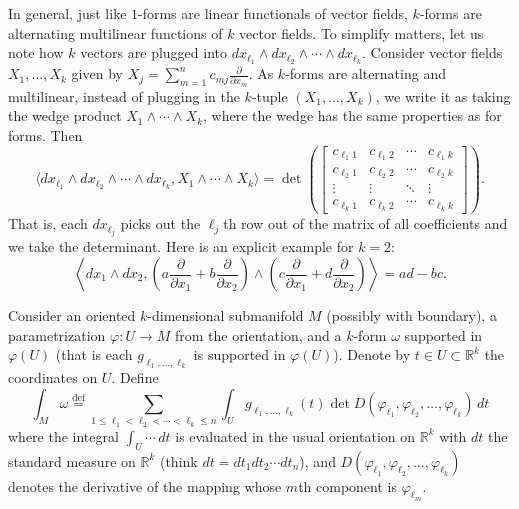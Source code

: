 \documentclass[12pt,openany]{book}
\newcommand{\R}{{\mathbb{R}}}
\theoremstyle{plain}
\theoremstyle{remark}
\theoremstyle{definition}
\theoremstyle{exercise}
\theoremstyle{example}
\begin{document}
In general, just like $1$-forms are linear functionals of vector fields,
$k$-forms are alternating multilinear functions of $k$ vector fields.
To simplify matters, let us note how
$k$ vectors are plugged into
$dx_{\ell_1} \wedge dx_{\ell_2} \wedge \cdots \wedge dx_{\ell_k}$.
Consider vector fields $X_1,\ldots,X_k$ given by
$X_j = \sum_{m=1}^n c_{m j} \frac{\partial}{\partial x_m}$.
As $k$-forms are alternating and multilinear, instead of plugging in
the $k$-tuple $(X_1,\ldots,X_k)$, we write it as taking the
wedge product $X_1 \wedge \cdots \wedge X_k$, where the wedge has the
same properties as for forms.
Then
\begin{equation*}
\bigl\langle
dx_{\ell_1} \wedge
dx_{\ell_2} \wedge
\cdots \wedge
dx_{\ell_k}
,
X_1 \wedge \cdots \wedge X_k
\rangle
=
\det
\left(
\begin{bmatrix}
c_{\ell_1 1} & c_{\ell_1 2} & \cdots & c_{\ell_1 k} \\
c_{\ell_2 1} & c_{\ell_2 2} & \cdots & c_{\ell_2 k} \\
\vdots & \vdots & \ddots & \vdots \\
c_{\ell_k 1} & c_{\ell_k 2} & \cdots & c_{\ell_k k}
\end{bmatrix}
\right) .
\end{equation*}
That is, each $dx_{\ell_j}$ picks out the $\ell_j$th row out of the matrix
of all coefficients and we take the determinant.  Here is an explicit
example for $k=2$:
\begin{equation*}
\left\langle
dx_1 \wedge dx_2
,
\left(
a \frac{\partial}{\partial x_1} +
b \frac{\partial}{\partial x_2}
\right)
\wedge
\left(
c \frac{\partial}{\partial x_1} +
d \frac{\partial}{\partial x_2}
\right)
\right\rangle
=
ad-bc .
\end{equation*}

Consider
an oriented $k$-dimensional submanifold $M$
(possibly with boundary), a parametrization $\varphi \colon U \to M$
from the orientation,
and a $k$-form $\omega$
supported in $\varphi(U)$ (that is each $g_{\ell_1,\ldots,\ell_k}$ is supported in
$\varphi(U)$).
Denote by $t \in U \subset \R^k$
the coordinates on $U$.  Define
\begin{equation*}
\int_M \omega
\overset{\text{def}}{=}
\sum_{1 \leq \ell_1 < \ell_2 < \cdots < \ell_k \leq n}
\int_U
g_{\ell_1,\ldots,\ell_k}(t)
\det D (\varphi_{\ell_1},\varphi_{\ell_2},\ldots,\varphi_{\ell_k})
\,
dt
\end{equation*}
where the integral $\int_U \cdots\, dt$ is evaluated in the
usual orientation on $\R^k$ with $dt$ the standard
measure on $\R^k$ (think $dt = dt_1 dt_2 \cdots dt_n$), and
$D (\varphi_{\ell_1},\varphi_{\ell_2},\ldots,\varphi_{\ell_k})$
denotes the derivative of the mapping whose $m$th component
is $\varphi_{\ell_m}$.
\end{document}
